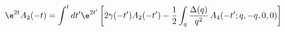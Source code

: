 \begin{equation}
\e^{2t} A_2 (-t) = \int^t dt' \e^{2t'} \left[ 2 \gamma (-t') A_2 (-t')
- \frac{1}{2} \int_q \frac{\Delta (q)}{q^2}\, A_4 (-t'; q,-q,0,0)
\right]
\end{equation}

